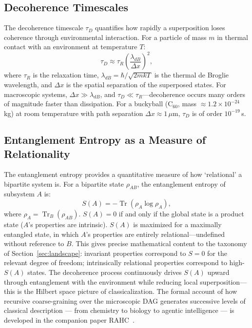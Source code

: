 \documentclass[11pt,a4paper]{article}
\theoremstyle{plain}
\theoremstyle{definition}
\theoremstyle{remark}
\begin{document}
\subsection{Decoherence Timescales}

The decoherence timescale $\tau_D$ quantifies how rapidly a superposition loses
coherence through environmental interaction. For a particle of mass $m$ in thermal
contact with an environment at temperature $T$:
\begin{equation}
  \tau_D \approx \tau_R \left(\frac{\lambda_{dB}}{\Delta x}\right)^{\!2},
\end{equation}
where $\tau_R$ is the relaxation time, $\lambda_{dB} = \hbar/\sqrt{2mkT}$ is the
thermal de Broglie wavelength, and $\Delta x$ is the spatial separation of the
superposed states. For macroscopic systems, $\Delta x \gg \lambda_{dB}$, and
$\tau_D \ll \tau_R$---decoherence occurs many orders of magnitude faster than
dissipation. For a buckyball (C$_{60}$, mass $\approx 1.2 \times 10^{-24}$\,kg)
at room temperature with path separation $\Delta x \approx 1\,\mu$m, $\tau_D$ is
of order $10^{-19}$\,s.

\subsection{Entanglement Entropy as a Measure of Relationality}

The entanglement entropy provides a quantitative measure of how `relational' a
bipartite system is. For a bipartite state $\rho_{AB}$, the entanglement entropy
of subsystem $A$ is:
\begin{equation}
  S(A) = -\operatorname{Tr}(\rho_A \log \rho_A),
\end{equation}
where $\rho_A = \operatorname{Tr}_B(\rho_{AB})$. $S(A) = 0$ if and only if the
global state is a product state ($A$'s properties are intrinsic). $S(A)$ is
maximized for a maximally entangled state, in which $A$'s properties are entirely
relational---undefined without reference to $B$. This gives precise mathematical
content to the taxonomy of Section~\ref{sec:landscape}: invariant properties
correspond to $S = 0$ for the relevant degree of freedom; intrinsically relational
properties correspond to high-$S(A)$ states. The decoherence process continuously
drives $S(A)$ upward through entanglement with the environment while reducing
local superposition---this is the Hilbert space picture of classicalization.
The formal account of how recursive coarse-graining over the microscopic DAG
generates successive levels of classical description — from chemistry to biology
to agentic intelligence — is developed in the companion paper
RAHC~\citep{Sandeman2026RAHC}.
\end{document}
